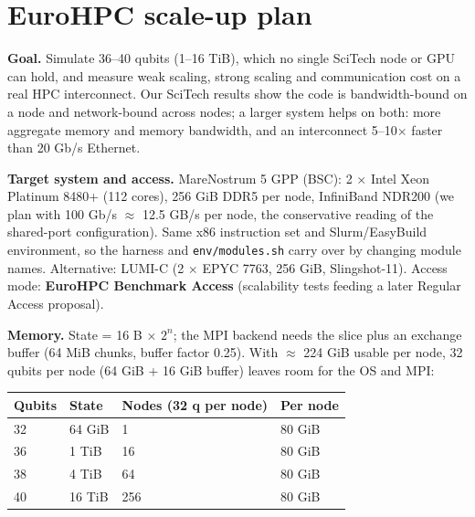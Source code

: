 \documentclass[10pt,a4paper]{article}
\begin{document}
\newpage



\section*{EuroHPC scale-up plan}



\textbf{Goal.} Simulate 36--40 qubits (1--16 TiB), which no single SciTech node or GPU can hold, and measure weak scaling, strong scaling and communication cost on a real HPC interconnect. Our SciTech results show the code is bandwidth-bound on a node and network-bound across nodes; a larger system helps on both: more aggregate memory and memory bandwidth, and an interconnect 5--10$\times$ faster than 20 Gb/s Ethernet.



\textbf{Target system and access.} MareNostrum 5 GPP (BSC): 2 $\times$ Intel Xeon Platinum 8480+ (112 cores), 256 GiB DDR5 per node, InfiniBand NDR200 (we plan with 100 Gb/s $\approx$ 12.5 GB/s per node, the conservative reading of the shared-port configuration). Same x86 instruction set and Slurm/EasyBuild environment, so the harness and \texttt{env/modules.sh} carry over by changing module names. Alternative: LUMI-C (2 $\times$ EPYC 7763, 256 GiB, Slingshot-11). Access mode: \textbf{EuroHPC Benchmark Access} (scalability tests feeding a later Regular Access proposal).



\textbf{Memory.} State = 16 B $\times$ $2^{n}$; the MPI backend needs the slice plus an exchange buffer (64 MiB chunks, buffer factor 0.25). With $\approx$ 224 GiB usable per node, 32 qubits per node (64 GiB + 16 GiB buffer) leaves room for the OS and MPI:



\begin{table}[ht]\centering\small
\begin{tabularx}{\linewidth}{@{}XllX@{}}
\toprule
\textbf{Qubits} & \textbf{State} & \textbf{Nodes (32 q per node)} & \textbf{Per node} \\
\midrule
32 & 64 GiB & 1 & 80 GiB \\
36 & 1 TiB & 16 & 80 GiB \\
38 & 4 TiB & 64 & 80 GiB \\
40 & 16 TiB & 256 & 80 GiB \\
\bottomrule
\end{tabularx}
\end{table}
\end{document}
